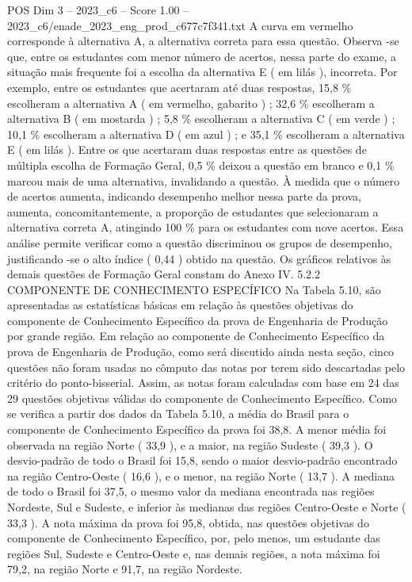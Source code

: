 \begin{textsample}{POS Dim 3 – 2023\_c6 – Score 1.00 – 2023\_c6/enade\_2023\_eng\_prod\_c677c7f341.txt}
A curva em vermelho corresponde à alternativa A, a alternativa correta para essa questão.
Observa -se que, entre os estudantes com menor número de acertos, nessa parte do exame, a situação mais frequente foi a escolha da alternativa E ( em lilás ), incorreta.
Por exemplo, entre os estudantes que acertaram até duas respostas, 15,8 \% escolheram a alternativa A ( em vermelho, gabarito ) ; 32,6 \% escolheram a alternativa B ( em mostarda ) ; 5,8 \% escolheram a alternativa C ( em verde ) ; 10,1 \% escolheram a alternativa D ( em azul ) ; e 35,1 \% escolheram a alternativa E ( em lilás ).
Entre os que acertaram duas respostas entre as questões de múltipla escolha de Formação Geral, 0,5 \% deixou a questão em branco e 0,1 \% marcou mais de uma alternativa, invalidando a questão.
À medida que o número de acertos aumenta, indicando desempenho melhor nessa parte da prova, aumenta, concomitantemente, a proporção de estudantes que selecionaram a alternativa correta A, atingindo 100 \% para os estudantes com nove acertos.
Essa análise permite verificar como a questão discriminou os grupos de desempenho, justificando -se o alto índice ( 0,44 ) obtido na questão.
Os gráficos relativos às demais questões de Formação Geral constam do Anexo IV. 5.2.2 COMPONENTE DE CONHECIMENTO ESPECÍFICO Na Tabela 5.10, são apresentadas as estatísticas básicas em relação às questões objetivas do componente de Conhecimento Específico da prova de Engenharia de Produção por grande região.
Em relação ao componente de Conhecimento Específico da prova de Engenharia de Produção, como será discutido ainda nesta seção, cinco questões não foram usadas no cômputo das notas por terem sido descartadas pelo critério do ponto-bisserial.
Assim, as notas foram calculadas com base em 24 das 29 questões objetivas válidas do componente de Conhecimento Específico.
Como se verifica a partir dos dados da Tabela 5.10, a média do Brasil para o componente de Conhecimento Específico da prova foi 38,8.
A menor média foi observada na região Norte ( 33,9 ), e a maior, na região Sudeste ( 39,3 ).
O desvio-padrão de todo o Brasil foi 15,8, sendo o maior desvio-padrão encontrado na região Centro-Oeste ( 16,6 ), e o menor, na região Norte ( 13,7 ).
A mediana de todo o Brasil foi 37,5, o mesmo valor da mediana encontrada nas regiões Nordeste, Sul e Sudeste, e inferior às medianas das regiões Centro-Oeste e Norte ( 33,3 ).
A nota máxima da prova foi 95,8, obtida, nas questões objetivas do componente de Conhecimento Específico, por, pelo menos, um estudante das regiões Sul, Sudeste e Centro-Oeste e, nas demais regiões, a nota máxima foi 79,2, na região Norte e 91,7, na região Nordeste.

\end{textsample}
